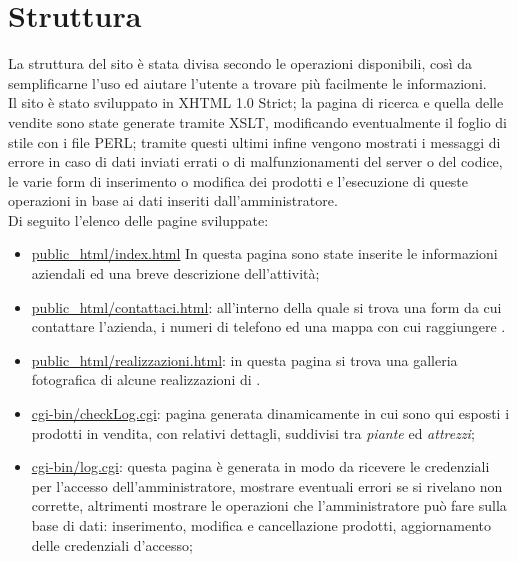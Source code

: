 \section{Struttura}{
	La struttura del sito è stata divisa secondo le operazioni disponibili, così da semplificarne l'uso ed aiutare l'utente a trovare più facilmente le informazioni.
	\\
	Il sito è stato sviluppato in XHTML 1.0 Strict; la pagina di ricerca e quella delle vendite sono state generate tramite XSLT, modificando eventualmente il foglio di stile con i file PERL; tramite questi ultimi infine vengono mostrati i messaggi di errore in caso di dati inviati errati o di malfunzionamenti del server o del codice, le varie form di inserimento o modifica dei prodotti e l'esecuzione di queste operazioni in base ai dati inseriti dall'amministratore.
	\\
	Di seguito l'elenco delle pagine sviluppate:
	\begin{itemize}\itemsep1pt
		\item \href{http://tecnologie-web.studenti.math.unipd.it/tecweb/~pgabelli/}{public_html/index.html} In questa pagina sono state inserite le informazioni aziendali ed una breve descrizione dell'attività;
		\item \href{http://tecnologie-web.studenti.math.unipd.it/tecweb/~pgabelli/contattaci.html}{public_html/contattaci.html}: all'interno della quale si trova una form da cui contattare l'azienda, i numeri di telefono ed una mappa con cui raggiungere \textbf{\ggt} .
		\item \href{http://tecnologie-web.studenti.math.unipd.it/tecweb/~pgabelli/realizzazioni.html}{public_html/realizzazioni.html}: in questa pagina si trova una galleria fotografica di alcune realizzazioni di \textbf{\ggt}.
		\item \href{http://tecnologie-web.studenti.math.unipd.it/tecweb/~pgabelli/cgi-bin/checkLog.cgi}{cgi-bin/checkLog.cgi}: pagina generata dinamicamente in cui sono qui esposti i prodotti in vendita, con relativi dettagli, suddivisi tra \textit{piante} ed \textit{attrezzi};
		\item \href{http://tecnologie-web.studenti.math.unipd.it/tecweb/~pgabelli/cgi-bin/log.cgi}{cgi-bin/log.cgi}: questa pagina è generata in modo da ricevere le credenziali per l'accesso dell'amministratore, mostrare eventuali errori se si rivelano non corrette, altrimenti mostrare le operazioni che l'amministratore può fare sulla base di dati: inserimento, modifica e cancellazione prodotti, aggiornamento delle credenziali d'accesso;

\end{itemize}}
